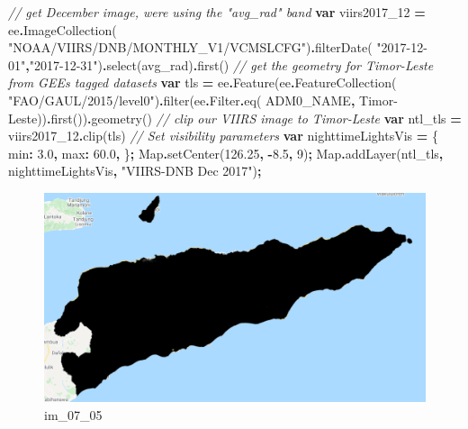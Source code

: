 \documentclass[
]{article}
\newenvironment{Shaded}{\begin{snugshade}}{\end{snugshade}}
\newcommand{\AttributeTok}[1]{\textcolor[rgb]{0.77,0.63,0.00}{#1}}
\newcommand{\BuiltInTok}[1]{#1}
\newcommand{\CommentTok}[1]{\textcolor[rgb]{0.56,0.35,0.01}{\textit{#1}}}
\newcommand{\DataTypeTok}[1]{\textcolor[rgb]{0.13,0.29,0.53}{#1}}
\newcommand{\DecValTok}[1]{\textcolor[rgb]{0.00,0.00,0.81}{#1}}
\newcommand{\FloatTok}[1]{\textcolor[rgb]{0.00,0.00,0.81}{#1}}
\newcommand{\FunctionTok}[1]{\textcolor[rgb]{0.00,0.00,0.00}{#1}}
\newcommand{\KeywordTok}[1]{\textcolor[rgb]{0.13,0.29,0.53}{\textbf{#1}}}
\newcommand{\NormalTok}[1]{#1}
\newcommand{\OperatorTok}[1]{\textcolor[rgb]{0.81,0.36,0.00}{\textbf{#1}}}
\newcommand{\StringTok}[1]{\textcolor[rgb]{0.31,0.60,0.02}{#1}}
\begin{document}
\begin{Shaded}
\begin{Highlighting}[]
\CommentTok{// get December image, we\textquotesingle{}re using the "avg\_rad" band}
\KeywordTok{var}\NormalTok{ viirs2017\_12 }\OperatorTok{=}\NormalTok{ ee}\OperatorTok{.}\FunctionTok{ImageCollection}\NormalTok{(}
  \StringTok{"NOAA/VIIRS/DNB/MONTHLY\_V1/VCMSLCFG"}\NormalTok{)}\OperatorTok{.}\FunctionTok{filterDate}\NormalTok{(}
  \StringTok{"2017{-}12{-}01"}\OperatorTok{,}\StringTok{"2017{-}12{-}31"}\NormalTok{)}\OperatorTok{.}\FunctionTok{select}\NormalTok{(}\StringTok{\textquotesingle{}avg\_rad\textquotesingle{}}\NormalTok{)}\OperatorTok{.}\FunctionTok{first}\NormalTok{()}
\CommentTok{// get the geometry for Timor{-}Leste from GEE\textquotesingle{}s tagged datasets}
\KeywordTok{var}\NormalTok{ tls }\OperatorTok{=}\NormalTok{ ee}\OperatorTok{.}\FunctionTok{Feature}\NormalTok{(ee}\OperatorTok{.}\FunctionTok{FeatureCollection}\NormalTok{(}
  \StringTok{"FAO/GAUL/2015/level0"}\NormalTok{)}\OperatorTok{.}\FunctionTok{filter}\NormalTok{(ee}\OperatorTok{.}\AttributeTok{Filter}\OperatorTok{.}\FunctionTok{eq}\NormalTok{(}
  \StringTok{\textquotesingle{}ADM0\_NAME\textquotesingle{}}\OperatorTok{,} \StringTok{\textquotesingle{}Timor{-}Leste\textquotesingle{}}\NormalTok{))}\OperatorTok{.}\FunctionTok{first}\NormalTok{())}\OperatorTok{.}\FunctionTok{geometry}\NormalTok{()}
\CommentTok{// clip our VIIRS image to Timor{-}Leste}
\KeywordTok{var}\NormalTok{ ntl\_tls }\OperatorTok{=}\NormalTok{ viirs2017\_12}\OperatorTok{.}\FunctionTok{clip}\NormalTok{(tls)}
\CommentTok{// Set visibility parameters}
\KeywordTok{var}\NormalTok{ nighttimeLightsVis }\OperatorTok{=}\NormalTok{ \{}
  \DataTypeTok{min}\OperatorTok{:} \FloatTok{3.0}\OperatorTok{,}
  \DataTypeTok{max}\OperatorTok{:} \FloatTok{60.0}\OperatorTok{,}
\NormalTok{\}}\OperatorTok{;}
\BuiltInTok{Map}\OperatorTok{.}\FunctionTok{setCenter}\NormalTok{(}\FloatTok{126.25}\OperatorTok{,} \OperatorTok{{-}}\FloatTok{8.5}\OperatorTok{,} \DecValTok{9}\NormalTok{)}\OperatorTok{;}
\BuiltInTok{Map}\OperatorTok{.}\FunctionTok{addLayer}\NormalTok{(ntl\_tls}\OperatorTok{,}\NormalTok{ nighttimeLightsVis}\OperatorTok{,} \StringTok{\textquotesingle{}"VIIRS{-}DNB Dec 2017"\textquotesingle{}}\NormalTok{)}\OperatorTok{;}
\end{Highlighting}
\end{Shaded}

\begin{figure}
\centering
\includegraphics{./im/im_07_05.png}
\caption{im\_07\_05}
\end{figure}
\end{document}
